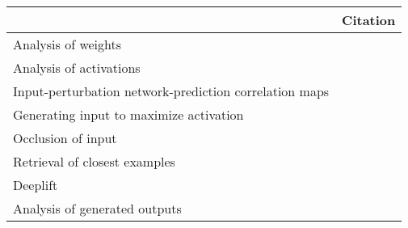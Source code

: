 \begin{tabular}{ll}
\toprule
{} &                                                                                                                                                                                          Citation \\
\midrule
Analysis of weights                                    &  \cite{Perez-Benitez2018, Yoon2018, Langkvist2018, Deiss2018, Lawhern2018, Xu2016, Tsinalis2016a, Nurse2016, Tabar2016a, Zheng2015, Stober2015, Manor2015, Yang2015a, Langkvist2012, Cecotti2011} \\
Analysis of activations                                &                                                                                           \cite{Yuan2018a, Waytowich2018, Lawhern2018, kwak2017, Yin2017a, Supratak2017, Shamwell2016, Manor2015} \\
Input-perturbation network-prediction correlation maps &                                                                                                              \cite{Schirrmeister2017a, Volker2018, Hartmann2018b, Behncke2017, Schirrmeister2017} \\
Generating input to maximize activation                &                                                                                                                                      \cite{VanPutten2018b, Ruffini2018a, Sors2018, Bashivan2016a} \\
Occlusion of input                                     &                                                                                                                                                        \cite{Lee2018, Chambon2018, Thodoroff2016} \\
Retrieval of closest examples                          &                                                                                                                                                                                  \cite{Deiss2018} \\
Deeplift                                               &                                                                                                                                                                                \cite{Lawhern2018} \\
Analysis of generated outputs                          &                                                                                                                                                                               \cite{Hartmann2018} \\

\end{tabular}
